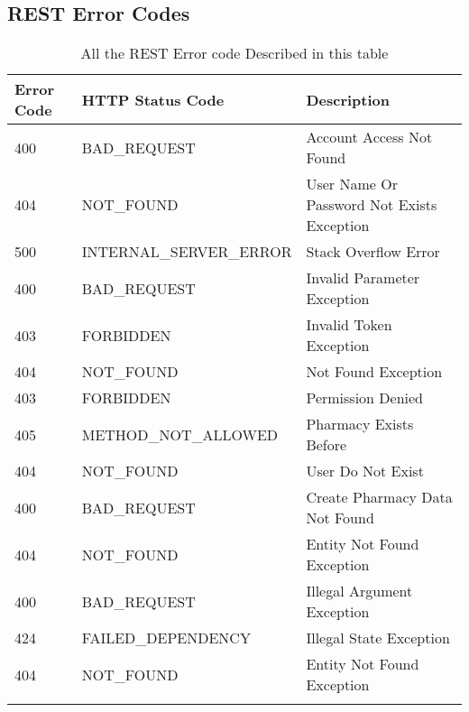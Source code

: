 \subsection{REST Error Codes}



\begin{longtable}{|p{}|p{} |p{}|} 
\hline
\textbf{Error Code} & \textbf{HTTP Status Code} & \textbf{Description} \\\hline
400 & BAD\_REQUEST &  Account Access Not Found \\\hline
404 & NOT\_FOUND &  User Name Or Password Not Exists Exception \\\hline
500 & INTERNAL\_SERVER\_ERROR &  Stack Overflow Error \\\hline
400 & BAD\_REQUEST &  Invalid Parameter Exception \\\hline
403 & FORBIDDEN & Invalid Token Exception \\\hline
404 & NOT\_FOUND &  Not Found Exception \\\hline
403 & FORBIDDEN &  Permission Denied \\\hline
405 & METHOD\_NOT\_ALLOWED &  Pharmacy Exists Before \\\hline
404 & NOT\_FOUND &  User Do Not Exist \\\hline
400 & BAD\_REQUEST &  Create Pharmacy Data Not Found \\\hline
404 & NOT\_FOUND &  Entity Not Found Exception \\\hline
400 & BAD\_REQUEST &  Illegal Argument Exception \\\hline
424 & FAILED\_DEPENDENCY &  Illegal State Exception \\\hline
404 & NOT\_FOUND &  Entity Not Found Exception \\\hline
\caption{All the REST Error code Described in this table }
\label{tab:termGlossary}
\end{longtable}
